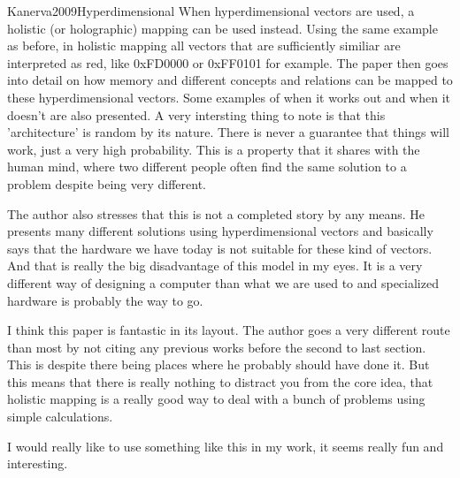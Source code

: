 \begin{review}{Kanerva2009Hyperdimensional}
    When hyperdimensional vectors are used, a holistic (or holographic) mapping can be used instead.
    Using the same example as before, in holistic mapping all vectors that are sufficiently similiar are interpreted as red, like 0xFD0000 or 0xFF0101 for example.
    The paper then goes into detail on how memory and different concepts and relations can be mapped to these hyperdimensional vectors.
    Some examples of when it works out and when it doesn't are also presented.
    A very intersting thing to note is that this 'architecture' is random by its nature.
    There is never a guarantee that things will work, just a very high probability.
    This is a property that it shares with the human mind, where two different people often find the same solution to a problem despite being very different.
    
    The author also stresses that this is not a completed story by any means.
    He presents many different solutions using hyperdimensional vectors and basically says that the hardware we have today is not suitable for these kind of vectors.
    And that is really the big disadvantage of this model in my eyes.
    It is a very different way of designing a computer than what we are used to and specialized hardware is probably the way to go.
    
    I think this paper is fantastic in its layout.
    The author goes a very different route than most by not citing any previous works before the second to last section.
    This is despite there being places where he probably should have done it.
    But this means that there is really nothing to distract you from the core idea, that holistic mapping is a really good way to deal with a bunch of problems using simple calculations.
    
    I would really like to use something like this in my work, it seems really fun and interesting.

\end{review}
